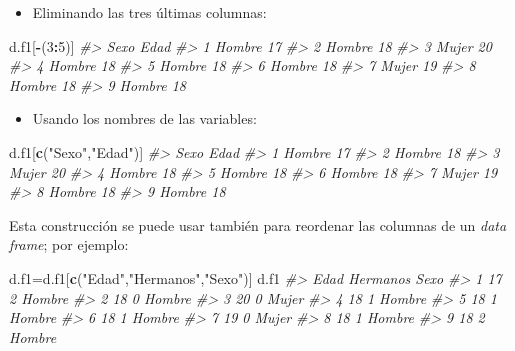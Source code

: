 \documentclass[
]{book}
\newenvironment{Shaded}{\begin{snugshade}}{\end{snugshade}}
\newcommand{\CommentTok}[1]{\textcolor[rgb]{0.56,0.35,0.01}{\textit{#1}}}
\newcommand{\DecValTok}[1]{\textcolor[rgb]{0.00,0.00,0.81}{#1}}
\newcommand{\KeywordTok}[1]{\textcolor[rgb]{0.13,0.29,0.53}{\textbf{#1}}}
\newcommand{\NormalTok}[1]{#1}
\newcommand{\OperatorTok}[1]{\textcolor[rgb]{0.81,0.36,0.00}{\textbf{#1}}}
\newcommand{\StringTok}[1]{\textcolor[rgb]{0.31,0.60,0.02}{#1}}
\providecommand{\tightlist}{%
  \setlength{\itemsep}{0pt}\setlength{\parskip}{0pt}}
\theoremstyle{definition}
\theoremstyle{definition}
\theoremstyle{definition}
\theoremstyle{remark}
\begin{document}
\begin{itemize}
\tightlist
\item
  Eliminando las tres últimas columnas:
\end{itemize}

\begin{Shaded}
\begin{Highlighting}[]
\NormalTok{d.f1[}\OperatorTok{{-}}\NormalTok{(}\DecValTok{3}\OperatorTok{:}\DecValTok{5}\NormalTok{)]}
\CommentTok{\#\textgreater{}     Sexo Edad}
\CommentTok{\#\textgreater{} 1 Hombre   17}
\CommentTok{\#\textgreater{} 2 Hombre   18}
\CommentTok{\#\textgreater{} 3  Mujer   20}
\CommentTok{\#\textgreater{} 4 Hombre   18}
\CommentTok{\#\textgreater{} 5 Hombre   18}
\CommentTok{\#\textgreater{} 6 Hombre   18}
\CommentTok{\#\textgreater{} 7  Mujer   19}
\CommentTok{\#\textgreater{} 8 Hombre   18}
\CommentTok{\#\textgreater{} 9 Hombre   18}
\end{Highlighting}
\end{Shaded}

\begin{itemize}
\tightlist
\item
  Usando los nombres de las variables:
\end{itemize}

\begin{Shaded}
\begin{Highlighting}[]
\NormalTok{d.f1[}\KeywordTok{c}\NormalTok{(}\StringTok{"Sexo"}\NormalTok{,}\StringTok{"Edad"}\NormalTok{)]}
\CommentTok{\#\textgreater{}     Sexo Edad}
\CommentTok{\#\textgreater{} 1 Hombre   17}
\CommentTok{\#\textgreater{} 2 Hombre   18}
\CommentTok{\#\textgreater{} 3  Mujer   20}
\CommentTok{\#\textgreater{} 4 Hombre   18}
\CommentTok{\#\textgreater{} 5 Hombre   18}
\CommentTok{\#\textgreater{} 6 Hombre   18}
\CommentTok{\#\textgreater{} 7  Mujer   19}
\CommentTok{\#\textgreater{} 8 Hombre   18}
\CommentTok{\#\textgreater{} 9 Hombre   18}
\end{Highlighting}
\end{Shaded}

Esta construcción se puede usar también para reordenar las columnas de un \emph{data frame}; por ejemplo:

\begin{Shaded}
\begin{Highlighting}[]
\NormalTok{d.f1=d.f1[}\KeywordTok{c}\NormalTok{(}\StringTok{"Edad"}\NormalTok{,}\StringTok{"Hermanos"}\NormalTok{,}\StringTok{"Sexo"}\NormalTok{)]}
\NormalTok{d.f1}
\CommentTok{\#\textgreater{}   Edad Hermanos   Sexo}
\CommentTok{\#\textgreater{} 1   17        2 Hombre}
\CommentTok{\#\textgreater{} 2   18        0 Hombre}
\CommentTok{\#\textgreater{} 3   20        0  Mujer}
\CommentTok{\#\textgreater{} 4   18        1 Hombre}
\CommentTok{\#\textgreater{} 5   18        1 Hombre}
\CommentTok{\#\textgreater{} 6   18        1 Hombre}
\CommentTok{\#\textgreater{} 7   19        0  Mujer}
\CommentTok{\#\textgreater{} 8   18        1 Hombre}
\CommentTok{\#\textgreater{} 9   18        2 Hombre}
\end{Highlighting}
\end{Shaded}
\end{document}
